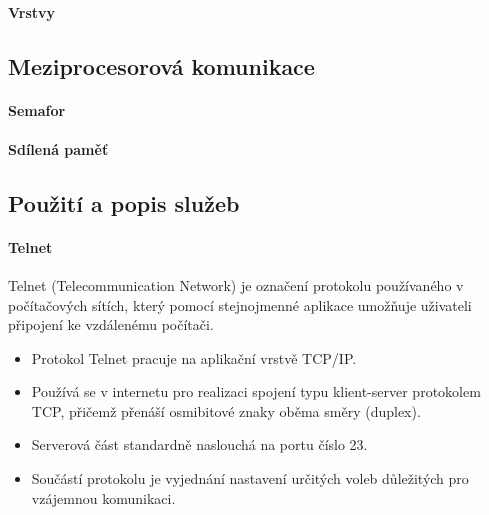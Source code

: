 \paragraph{Vrstvy}

\subsection{Meziprocesorová komunikace}
\paragraph{Semafor}
\paragraph{Sdílená paměť}

\subsection{Použití a popis služeb}
\paragraph{Telnet}
Telnet (Telecommunication Network) je označení protokolu používaného v počítačových sítích, který pomocí stejnojmenné aplikace umožňuje uživateli připojení ke vzdálenému počítači.
\begin{itemize}
    \item Protokol Telnet pracuje na aplikační vrstvě TCP/IP.
    \item Používá se v internetu pro realizaci spojení typu klient-server protokolem TCP, přičemž přenáší osmibitové znaky oběma směry (duplex).
    \item Serverová část standardně naslouchá na portu číslo 23.
    \item Součástí protokolu je vyjednání nastavení určitých voleb důležitých pro vzájemnou komunikaci.
\end{itemize}

